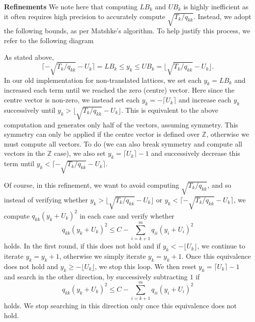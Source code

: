 \textbf{Refinements}
We note here that computing $LB_k$ and $UB_k$ is highly inefficient as it often requires high precision to accurately compute $\sqrt{T_k/q_{kk}}$. Instead, we adopt the following bounds, as per Matshke's algorithm. To help justify this process, we refer to the following diagram

\begin{center}
\end{center}

As stated above, 
\[\lceil -\sqrt{T_k/q_{kk}} - U_k \rceil= LB_k \leq y_k \leq UB_k = \lfloor \sqrt{T_k/q_{kk}} - U_k \rfloor.\]
In our old implementation for non-translated lattices, we set each $y_k = LB_k$ and increased each term until we reached the zero (centre) vector. Here since the centre vector is non-zero, we instead set each $y_k = -\lceil U_k \rceil$ and increase each $y_k$ successively until $y_k > \lfloor \sqrt{T_k/q_{kk}} - U_k \rfloor$. This is equivalent to the above computation and generates only half of the vectors, assuming symmetry. This symmetry can only be applied if the centre vector is defined over $\mathbb{Z}$, otherwise we must compute all vectors. To do (we can also break symmetry and compute all vectors in the $\mathbb{Z}$ case), we also set $y_k = \lceil U_k \rceil - 1$ and successively decrease this term until $y_k <\lceil -\sqrt{T_k/q_{kk}} - U_k \rceil$.

Of course, in this refinement, we want to avoid computing $\sqrt{T_k/q_{kk}}$, and so instead of verifying whether $y_k > \lfloor \sqrt{T_k/q_{kk}} - U_k \rfloor$ or $y_k <\lceil -\sqrt{T_k/q_{kk}} - U_k \rceil$, we compute $q_{kk}(y_k + U_k)^2$ in each case and verify whether
\[q_{kk}(y_k + U_k)^2 \leq C - \sum_{i = k+1}^m q_{ii}(y_i + U_i)^2\]
holds. In the first round, if this does not hold and if $y_k < -\lfloor U_k \rfloor$, we continue to iterate $y_k = y_k + 1$, otherwise we simply iterate $y_k = y_k + 1$. Once this equivalence does not hold and $y_k \geq -\lfloor U_k \rfloor$, we stop this loop. We then reset $y_k = \lceil U_k \rceil - 1$ and search in the other direction, by successively subtracting $1$ if 
\[q_{kk}(y_k + U_k)^2 \leq C - \sum_{i = k+1}^m q_{ii}(y_i + U_i)^2\]
holds. We stop searching in this direction only once this equivalence does not hold.  

